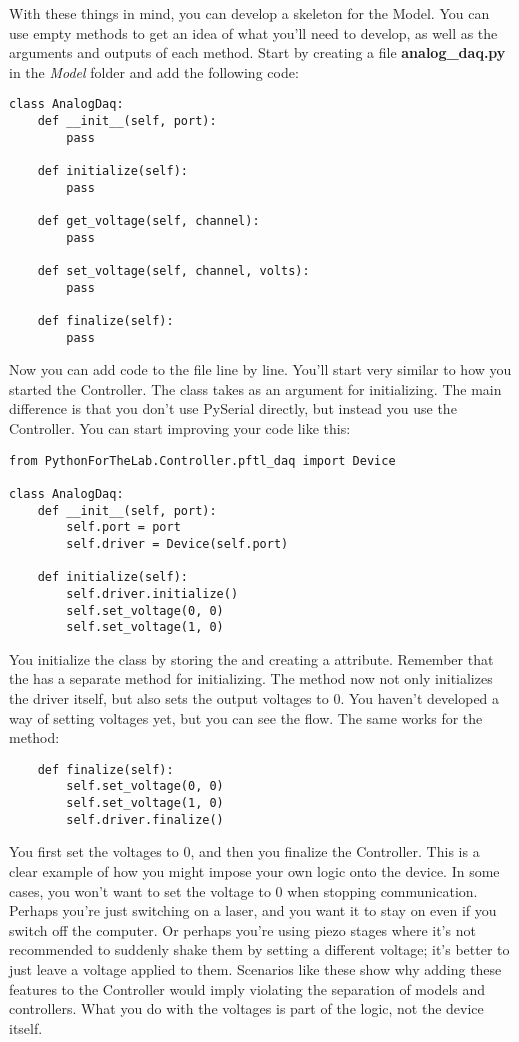 With these things in mind, you can develop a skeleton for the Model. You can use empty methods to get an idea of what you'll need to develop, as well as the arguments and outputs of each method. Start by creating a file \textbf{analog\_daq.py} in the \emph{Model} folder and add the following code:

\begin{verbatim}
class AnalogDaq:
    def __init__(self, port):
        pass

    def initialize(self):
        pass

    def get_voltage(self, channel):
        pass

    def set_voltage(self, channel, volts):
        pass

    def finalize(self):
        pass
\end{verbatim}

Now you can add code to the file line by line. You'll start very similar to how you started the Controller. The  class takes  as an argument for initializing. The main difference is that you don't use PySerial directly, but instead you use the Controller. You can start improving your code like this:

\begin{verbatim}
from PythonForTheLab.Controller.pftl_daq import Device

class AnalogDaq:
    def __init__(self, port):
        self.port = port
        self.driver = Device(self.port)

    def initialize(self):
        self.driver.initialize()
        self.set_voltage(0, 0)
        self.set_voltage(1, 0)
\end{verbatim}

You initialize the class by storing the  and creating a  attribute. Remember that the  has a separate method for initializing. The  method now not only initializes the driver itself, but also sets the output voltages to 0. You haven't developed a way of setting voltages yet, but you can see the flow. The same works for the  method:

\begin{verbatim}
    def finalize(self):
        self.set_voltage(0, 0)
        self.set_voltage(1, 0)
        self.driver.finalize()
\end{verbatim}

You first set the voltages to $0$, and then you finalize the Controller. This is a clear example of how you might impose your own logic onto the device. In some cases, you won't want to set the voltage to 0 when stopping communication. Perhaps you're just switching on a laser, and you want it to stay on even if you switch off the computer. Or perhaps you're using piezo stages where it's not recommended to suddenly shake them by setting a different voltage; it's better to just leave a voltage applied to them. Scenarios like these show why adding these features to the Controller would imply violating the separation of models and controllers. What you do with the voltages is part of the logic, not the device itself.

